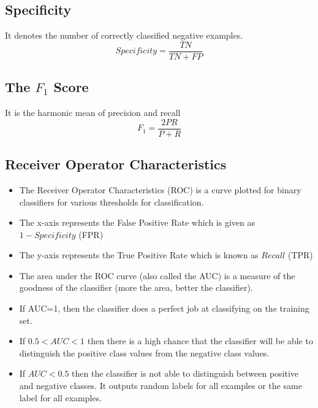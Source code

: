\documentclass{article}
\theoremstyle{plain}
\theoremstyle{definition}
\begin{document}
\subsection{Specificity}
It denotes the number of correctly classified negative examples. 
\begin{equation}
    Specificity = \frac{TN}{TN+FP}
\end{equation}

\subsection{The $F_1$ Score}
It is the harmonic mean of precision and recall
\begin{equation}
    F_1 = \frac{2 P R}{P + R}
\end{equation}

\subsection{Receiver Operator Characteristics}
\begin{itemize}

    \item The Receiver Operator Characteristics (ROC) is a curve plotted for binary classifiers for various thresholds for classification. 
    \item The x-axis represents the False Positive Rate which is given as $1-Specificity$ (FPR)
    
    \item The y-axis represents the True Positive Rate which is known as $Recall$ (TPR)
    
    \item The area under the ROC curve (also called the AUC) is a measure of the goodness of the classifier (more the area, better the classifier).
    
    \item If AUC=1, then the classifier does a perfect job at classifying on the training set. 
    
    \item If $0.5 < AUC < 1$ then there is a high chance that the classifier will be able to distinguish the positive class values from the negative class values. 
    
    \item If $ AUC < 0.5$ then the classifier is not able to distinguish between positive and negative classes. It outputs random labels for all examples or the same label for all examples. 
\end{itemize}
\end{document}
